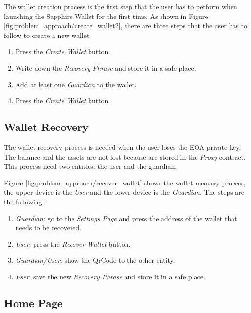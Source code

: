 The wallet creation process is the first step that the user has to perform when launching the Sapphire Wallet for the first time. As shown in Figure \ref{fig:problem_approach/create_wallet2}, there are three steps that the user has to follow to create a new wallet:

\begin{enumerate}
    \item Press the \textit{Create Wallet} button.
    \item Write down the \textit{Recovery Phrase} and store it in a safe place.
    \item Add at least one \textit{Guardian} to the wallet.
    \item Press the \textit{Create Wallet} button.
\end{enumerate}


\subsection{Wallet Recovery}
\label{subsec:wallet_recovery}

The wallet recovery process is needed when the user loses the EOA private key. The balance and the assets are not lost because are stored in the \textit{Proxy} contract. This process need two entities: the user and the guardian. 

Figure \ref{fig:problem_approach/recover_wallet} shows the wallet recovery process, the upper device is the \textit{User} and the lower device is the \textit{Guardian}. The steps are the following:
\begin{enumerate}
    \item \textit{Guardian}: go to the \textit{Settings Page} and press the address of the wallet that needs to be recovered.
    \item \textit{User}: press the \textit{Recover Wallet} button.
    \item \textit{Guardian/User}: show the QrCode to the other entity.
    \item \textit{User}: save the new \textit{Recovery Phrase} and store it in a safe place.
\end{enumerate}


\subsection{Home Page}
\label{subsec:wallet_home_page}

